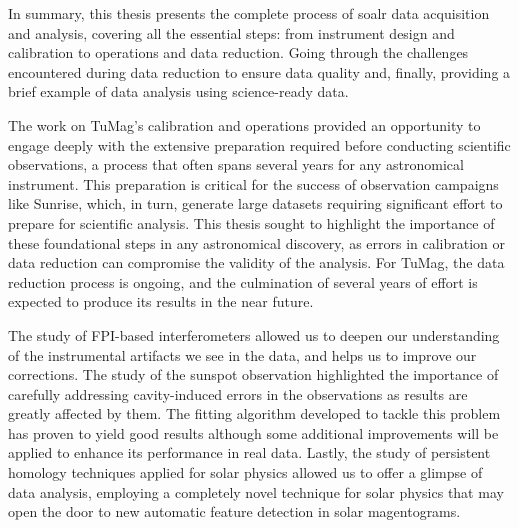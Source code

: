 In summary, this thesis presents the complete process of soalr data acquisition and analysis, covering all the essential steps: from instrument design and calibration to operations and data reduction. Going through the challenges encountered during data reduction to ensure data quality and, finally, providing a brief example of data analysis using science-ready data.

The work on TuMag's calibration and operations provided an opportunity to engage deeply with the extensive preparation required before conducting scientific observations, a process that often spans several years for any astronomical instrument. This preparation is critical for the success of observation campaigns like Sunrise, which, in turn, generate large datasets requiring significant effort to prepare for scientific analysis. This thesis sought to highlight the importance of these foundational steps in any astronomical discovery, as errors in calibration or data reduction can compromise the validity of the analysis. 
For TuMag, the data reduction process is ongoing, and the culmination of several years of effort is expected to produce its results in the near future.   

The study of FPI-based interferometers allowed us to deepen our understanding of the instrumental artifacts we see in the data, and helps us to improve our corrections. The study of the sunspot observation highlighted the importance of carefully addressing cavity-induced errors in the observations as results are greatly affected by them. The fitting algorithm developed to tackle this problem has proven to yield good results although some additional improvements will be applied to enhance its performance in real data. Lastly, the study of persistent homology techniques applied for solar physics allowed us to offer a glimpse of data analysis, employing a completely novel technique for solar physics that may open the door to new automatic feature detection in solar magentograms.
